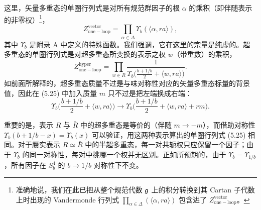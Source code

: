 
这里，矢量多重态的单圈行列式是对所有规范群因子的根 $\alpha$ 的乘积（即伴随表示的非零权）\footnote{准确地说，我们在此已把从整个规范代数 $\mathfrak{g}$ 上的积分转换到其 Cartan 子代数上时出现的 Vandermonde 行列式 $\prod_{\alpha\in\Delta}(\langle\alpha,ra\rangle)$ 包含进了 $Z^{\mathrm{vector}}_{\mathrm{one-loop}}$。}，
\begin{equation}
  Z^{\mathrm{vector}}_{\mathrm{one-loop}} = \prod_{\alpha\in\Delta}\Upsilon_b(\langle\alpha,ra\rangle),
  \tag{5.24}
\end{equation}
其中 $\Upsilon_b$ 是附录 A 中定义的特殊函数。我们强调，它在这里的宗量是纯虚的。超多重态的单圈行列式是对超多重态所变换的表示之权 $w$（带重数）的乘积，
\begin{equation}
  Z^{\mathrm{hyper}}_{\mathrm{one-loop}} = \prod_{w\in R}\frac{1}{\Upsilon_b\Big(\frac{b+1/b}{2}+\langle w,ra\rangle\Big)}.
  \tag{5.25}
\end{equation}
如前面所解释的，超多重态质量不过是与味对称性对应的矢量多重态标量的背景值，因此在 (5.25) 中加入质量 $m$ 只不过是把左端换成右端：
\begin{equation}
  \Upsilon_b\Big(\frac{b+1/b}{2}+\langle w,ra\rangle\Big)\to\Upsilon_b\Big(\frac{b+1/b}{2}+\langle w,ra\rangle+rm\Big).
  \tag{5.26}
\end{equation}

重要的是，表示 $R$ 与 $\bar R$ 中的超多重态是等价的（伴随 $m\to-m$），而借助对称性 $\Upsilon_b(b+1/b-x)=\Upsilon_b(x)$ 可以验证，用这两种表示算出的单圈行列式 (5.25) 相同。对于赝实表示 $R\simeq\bar R$ 中的半超多重态，每一对共轭权只应保留一个因子；由于 $\Upsilon_b$ 的同一对称性，每对中挑哪一个权并无区别。正如所预期的，由于 $\Upsilon_b=\Upsilon_{1/b}$，所有因子在 $S^4_b$ 的 $b\to1/b$ 对称性下不变。


